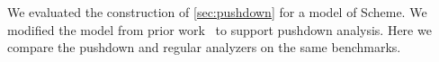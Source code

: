 We evaluated the construction of \autoref{sec:pushdown} for a model of Scheme.
%
We modified the model from prior work~\citep{ianjohnson:oaam:icfp2013} to support pushdown analysis.
%
Here we compare the pushdown and regular analyzers on the same benchmarks.
%
